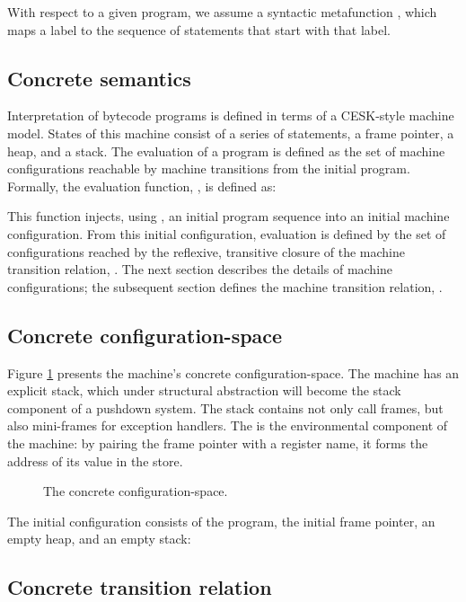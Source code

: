 With respect to a given program, we assume a syntactic metafunction
, which maps a label to the
sequence of statements that start with that label.



\subsection{Concrete semantics} \label{sec:conc-sem}

Interpretation of bytecode programs is defined in terms of a
CESK-style machine model.  States of this machine consist of a series
of statements, a frame pointer, a heap, and a stack.  The evaluation
of a program is defined as the set of machine configurations reachable
by machine transitions from the initial program.  Formally, the
evaluation function,
,
is defined as:
  
This function injects, using , an
initial program sequence into an initial machine configuration.  From
this initial configuration, evaluation is defined by the set of
configurations reached by the reflexive, transitive closure of the
machine transition relation, .  The next section describes the details of machine
configurations; the subsequent section defines the machine
transition relation, .

\subsection{Concrete configuration-space} \label{subsec:conc-ss}

Figure \ref{fig:conc-conf-space} presents the machine's concrete
configuration-space.  The machine has an explicit stack, which under
structural abstraction will become the stack component of a pushdown
system.  The stack contains not only call frames, but also mini-frames
for exception handlers.
The  is the environmental
component of the machine: by pairing the frame pointer with a
register name, it forms the address of its value in the store.

 \begin{figure}

\caption{The concrete configuration-space.}
\label{fig:conc-conf-space}
 \end{figure}
 
The initial configuration consists of the program, the initial frame
pointer, an empty heap, and an empty stack:




\subsection{Concrete transition relation} \label{subsec:conc-tr}


